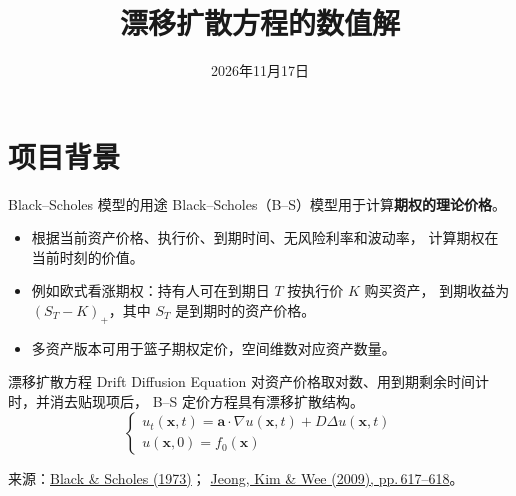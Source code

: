 \documentclass[UTF8,aspectratio=169,10pt]{ctexbeamer}
\title[漂移扩散方程的数值解]{漂移扩散方程的数值解}
\author{}\institute{}\date[]{2026年11月17日}
\begin{document}
\begin{frame}[plain]\titlepage\end{frame}
\section{项目背景}
\begin{frame}{Black--Scholes 模型的用途}
Black--Scholes（B--S）模型用于计算\textbf{期权的理论价格}。
\begin{itemize}
\item 根据当前资产价格、执行价、到期时间、无风险利率和波动率，
      计算期权在当前时刻的价值。
\item 例如欧式看涨期权：持有人可在到期日 $T$ 按执行价 $K$ 购买资产，
      到期收益为 $(S_T-K)_+$，其中 $S_T$ 是到期时的资产价格。
\item 多资产版本可用于篮子期权定价，空间维数对应资产数量。
\end{itemize}
\begin{block}{漂移扩散方程 Drift Diffusion Equation}
对资产价格取对数、用到期剩余时间计时，并消去贴现项后，
B--S 定价方程具有漂移扩散结构。
\begin{equation*}
      \begin{cases}
            u_t(\boldsymbol{x},t) = \boldsymbol{a}\cdot \nabla u(\boldsymbol{x},t) + D\Delta u(\boldsymbol{x},t)\\
            u(\boldsymbol{x},0) = f_0(\boldsymbol{x})
      \end{cases}
\end{equation*}
\end{block}
\vfill
{\scriptsize 来源：\href{https://doi.org/10.1086/260062}{Black \& Scholes (1973)}；
\href{https://doi.org/10.4134/CKMS.2009.24.4.617}{Jeong, Kim \& Wee (2009), pp.\,617--618}。\par}
\end{frame}
\end{document}
